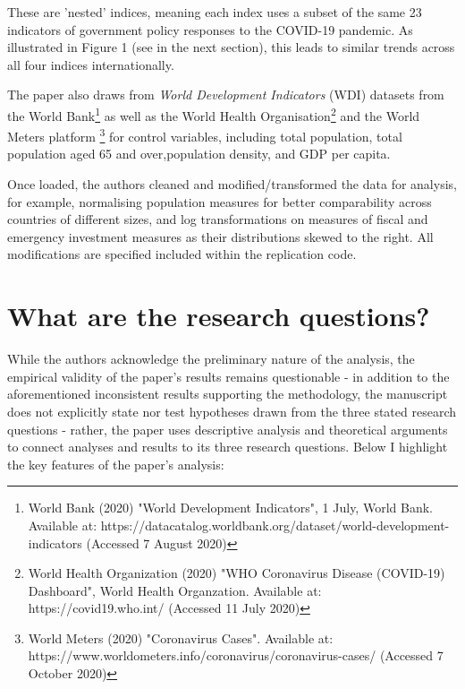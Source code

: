 \documentclass[12pt,letterpaper]{article}
\begin{document}
	\noindent These are 'nested' indices, meaning each index uses a subset of the same 23 indicators of government policy responses to the COVID-19 pandemic. As illustrated in Figure 1 (see in the next section), this leads to similar trends across all four indices internationally.
	\vspace{.25cm}
	
	\noindent The paper also draws from \textit{World Development Indicators} (WDI) datasets from the World Bank\footnote{World Bank (2020) "World Development Indicators", 1 July, World Bank. Available at: https://datacatalog.worldbank.org/dataset/world-development-indicators (Accessed 7 August 2020)} as well as the World Health Organisation\footnote{World Health Organization (2020) "WHO Coronavirus Disease (COVID-19) Dashboard", World Health Organzation. Available at: https://covid19.who.int/ (Accessed 11 July 2020)} and the World Meters platform \footnote{World Meters (2020) "Coronavirus Cases". Available at: https://www.worldometers.info/coronavirus/coronavirus-cases/ (Accessed 7 October 2020)} for control variables, including total population, total population aged 65 and over,population density, and GDP per capita.
	\vspace{.25cm}
	
	\noindent Once loaded, the authors cleaned and modified/transformed the data for analysis, for example, normalising population measures for better comparability across countries of different sizes, and log transformations on measures of fiscal and emergency investment measures as their distributions skewed to the right. All modifications are specified included within the replication code.

	\section*{What are the research questions?}
	\vspace{.25cm}
	
	\noindent While the authors acknowledge the preliminary nature of the analysis, the empirical validity of the paper's results remains questionable - in addition to the aforementioned inconsistent results supporting the methodology, the manuscript does not explicitly state nor test hypotheses drawn from the three stated research questions - rather, the paper uses descriptive analysis and theoretical arguments to connect analyses and results to its three research questions. Below I highlight the key features of the paper's analysis:
	
\end{document}
